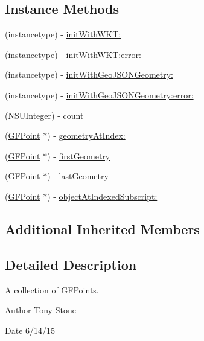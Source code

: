\subsection*{Instance Methods}
\begin{DoxyCompactItemize}
\item 
(instancetype) -\/ \hyperlink{interface_g_f_multi_point_a003eb1cee88057991c210dd0cd63ef7f}{init\+With\+W\+K\+T\+:}
\item 
(instancetype) -\/ \hyperlink{interface_g_f_multi_point_ab144e594c2bc87ce0353ecc833525f94}{init\+With\+W\+K\+T\+:error\+:}
\item 
(instancetype) -\/ \hyperlink{interface_g_f_multi_point_a08bc62987b4e8c0435b00367dd617e00}{init\+With\+Geo\+J\+S\+O\+N\+Geometry\+:}
\item 
(instancetype) -\/ \hyperlink{interface_g_f_multi_point_aed5c1b63f03328cb0796d3be78f790b1}{init\+With\+Geo\+J\+S\+O\+N\+Geometry\+:error\+:}
\item 
(N\+S\+U\+Integer) -\/ \hyperlink{interface_g_f_multi_point_afb692f3668a3631fbec6739c7fd7bf2c}{count}
\item 
(\hyperlink{interface_g_f_point}{G\+F\+Point} $\ast$) -\/ \hyperlink{interface_g_f_multi_point_a679f88a16cfc5e7d2d2bd1fda95303be}{geometry\+At\+Index\+:}
\item 
(\hyperlink{interface_g_f_point}{G\+F\+Point} $\ast$) -\/ \hyperlink{interface_g_f_multi_point_a2f300bc57f0010bc65da0f151b916e33}{first\+Geometry}
\item 
(\hyperlink{interface_g_f_point}{G\+F\+Point} $\ast$) -\/ \hyperlink{interface_g_f_multi_point_aa0c216ccbac49420bb8694fdb3311c6b}{last\+Geometry}
\item 
(\hyperlink{interface_g_f_point}{G\+F\+Point} $\ast$) -\/ \hyperlink{interface_g_f_multi_point_a003241a11b6d6da14364bb8a07c05a35}{object\+At\+Indexed\+Subscript\+:}
\end{DoxyCompactItemize}
\subsection*{Additional Inherited Members}


\subsection{Detailed Description}
A collection of G\+F\+Points. 

\begin{DoxyAuthor}{Author}
Tony Stone 
\end{DoxyAuthor}
\begin{DoxyDate}{Date}
6/14/15 
\end{DoxyDate}


